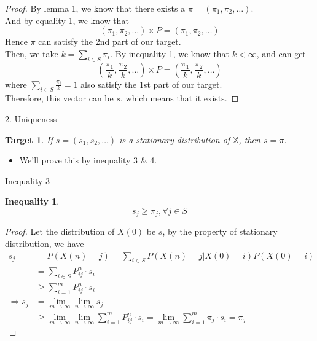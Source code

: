 \documentclass[mathserif]{beamer}
\newtheorem{ineq}{Inequality}
\newtheorem{target}{Target}
\begin{document}
\begin{frame}
	\begin{proof}
		By lemma 1, we know that there exists a $\pi = (\pi_1, \pi_2, \ldots)$. \\
		And by equality 1, we know that
		\[
		(\pi_1, \pi_2, \ldots) \times P = (\pi_1, \pi_2, \ldots)
		\]
		Hence $\pi$ can satisfy the 2nd part of our target. \\
		Then, we take $k = \sum_{i \in S} \pi_i$.
		By inequality 1, we know that $k < \infty$, and can get
		\[
		(\frac{\pi_1}{k}, \frac{\pi_2}{k}, \ldots) \times P = (\frac{\pi_1}{k}, \frac{\pi_2}{k}, \ldots)
		\]
		where $\sum_{i \in S} \frac{\pi_i}{k} = 1$ also satisfy the 1st part of our target. \\
		Therefore, this vector can be $s$, which means that it exists.
	\end{proof}
\end{frame}

\begin{frame}{2. Uniqueness}
	\begin{target}
		If $s = (s_1, s_2, \ldots)$ is a stationary distribution of $\mathbb{X}$, then $s = \pi$.
	\end{target}
	\begin{itemize}
		\item We'll prove this by inequality 3 \& 4.
	\end{itemize}
\end{frame}

\begin{frame}{Inequality 3}
	\begin{ineq}
		\[
		s_j \geq \pi_j, \forall j \in S
		\]
	\end{ineq}
\end{frame}

\begin{frame}
	\begin{proof}
		Let the distribution of $X(0)$ be $s$, by the property of stationary distribution, we have
		\begin{align*}
			             s_j &= P(X(n)=j) = \sum_{i \in S} P(X(n) = j | X(0) = i)P(X(0) = i) \\
			                 &= \sum_{i \in S} P^n_{ij} \cdot s_i \\
			                 &\geq \sum_{i=1}^m P^n_{ij} \cdot s_i \\
			\Rightarrow  s_j &= \lim_{m \to \infty}\lim_{n \to \infty} s_j \\
			                 &\geq \lim_{m \to \infty}\lim_{n \to \infty} \sum_{i=1}^m P^n_{ij} \cdot s_i
			                  = \lim_{m \to \infty}\sum_{i=1}^m \pi_j \cdot s_i = \pi_j
		\end{align*}
	\end{proof}
\end{frame}
\end{document}

